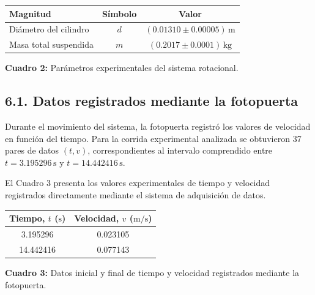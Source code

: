 \documentclass[11pt,a4paper]{article}
\begin{document}
\begin{table}[h!]
\centering
\renewcommand{\arraystretch}{1.25}

\begin{tabular}{lcc}
\hline
\textbf{Magnitud} & \textbf{Símbolo} & \textbf{Valor} \\
\hline
Diámetro del cilindro
& \(d\)
& \((0.01310 \pm 0.00005)\,\mathrm{m}\) \\

Masa total suspendida
& \(m\)
& \((0.2017 \pm 0.0001)\,\mathrm{kg}\) \\
\hline
\end{tabular}

\vspace{0.2cm}

\textbf{Cuadro 2:} Parámetros experimentales del sistema rotacional.

\end{table}



\subsection*{6.1. Datos registrados mediante la fotopuerta}

Durante el movimiento del sistema, la fotopuerta registró los valores
de velocidad en función del tiempo. Para la corrida experimental
analizada se obtuvieron 37 pares de datos \((t,v)\), correspondientes
al intervalo comprendido entre \(t=3.195296\,\mathrm{s}\) y
\(t=14.442416\,\mathrm{s}\).

El Cuadro 3 presenta los valores experimentales de tiempo y velocidad
registrados directamente mediante el sistema de adquisición de datos.

\begin{table}[h!]
\centering
\renewcommand{\arraystretch}{1.15}

\begin{tabular}{cc}
\hline
\textbf{Tiempo, \(t\) (\(\mathrm{s}\))}
&
\textbf{Velocidad, \(v\) (\(\mathrm{m/s}\))} \\
\hline


3.195296 & 0.023105 \\


14.442416 & 0.077143 \\

\hline
\end{tabular}

\vspace{0.2cm}

\textbf{Cuadro 3:} Datos inicial y final de tiempo y velocidad registrados mediante
la fotopuerta.

\end{table}
\end{document}
